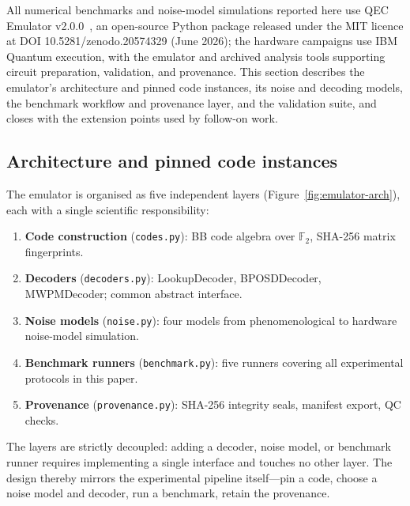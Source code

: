\documentclass[pdflatex,sn-mathphys-num]{sn-jnl}
\theoremstyle{thmstyleone}
\theoremstyle{thmstyletwo}
\theoremstyle{thmstylethree}
\begin{document}
All numerical benchmarks and noise-model simulations reported here use QEC Emulator v2.0.0~\cite{AlDaajeh2026emulator}, an open-source Python package released under the MIT licence at DOI 10.5281/zenodo.20574329 (June 2026); the hardware campaigns use IBM Quantum execution, with the emulator and archived analysis tools supporting circuit preparation, validation, and provenance. This section describes the emulator's architecture and pinned code instances, its noise and decoding models, the benchmark workflow and provenance layer, and the validation suite, and closes with the extension points used by follow-on work.

\subsection{Architecture and pinned code instances}

The emulator is organised as five independent layers (Figure~\ref{fig:emulator-arch}), each with a single scientific responsibility:

\begin{enumerate}[leftmargin=1.6em,label=\textbf{L\arabic*.}]
  \item \textbf{Code construction} (\texttt{codes.py}): BB code algebra over $\mathbb{F}_2$, SHA-256 matrix fingerprints.
  \item \textbf{Decoders} (\texttt{decoders.py}): LookupDecoder, BPOSDDecoder, MWPMDecoder; common abstract interface.
  \item \textbf{Noise models} (\texttt{noise.py}): four models from phenomenological to hardware noise-model simulation.
  \item \textbf{Benchmark runners} (\texttt{benchmark.py}): five runners covering all experimental protocols in this paper.
  \item \textbf{Provenance} (\texttt{provenance.py}): SHA-256 integrity seals, manifest export, QC checks.
\end{enumerate}

The layers are strictly decoupled: adding a decoder, noise model, or benchmark runner requires implementing a single interface and touches no other layer. The design thereby mirrors the experimental pipeline itself---pin a code, choose a noise model and decoder, run a benchmark, retain the provenance.
\end{document}
